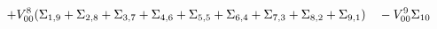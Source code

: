 \documentclass[12pt]{article}
\begin{document}
\begin{landscape}
\begin{dmath*}
\quad +V_{00}^{8}(\Sigma_{1,9}+\Sigma_{2,8}+\Sigma_{3,7}+\Sigma_{4,6}+\Sigma_{5,5}+\Sigma_{6,4}+\Sigma_{7,3}+\Sigma_{8,2}+\Sigma_{9,1}) \\
\quad -V_{00}^{9}\Sigma_{10} \\
\end{dmath*}\end{landscape}
\end{document}
